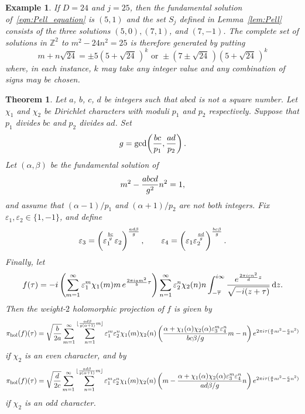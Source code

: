 \documentclass[11pt,reqno]{amsart}
\newtheorem{theorem}{Theorem}[section]
\renewcommand{\=}{\;=\;}
\theoremstyle{myremark}
\newtheorem*{example}{Example}
\newcommand{\dd}{\mathrm{d}}
\begin{document}
\begin{example}{\normalfont
If $D=24$ and $j=25$, then the fundamental solution of~\eqref{eqn:Pell_equation} is $(5,1)$ and the set $S_j$ defined in Lemma~\ref{lem:Pell} consists of the three solutions $(5,0), (7,1)$, and $(7,-1)$. 
The complete set of solutions in $\mathbb{Z}^2$ to $m^2 - 24n^2 = 25$ is therefore generated by putting
\[ 
m+n\sqrt{24} = \pm5(5+\sqrt{24}\,)^k \text{ or } \pm(7\pm\sqrt{24}\,) (5+\sqrt{24}\,)^k 
\]
where, in each instance, $k$ may take any integer value and any combination of signs may be chosen.}
\end{example}

\begin{theorem} \label{thm:hol_proj_eval} 
Let $a$, $b$, $c$, $d$ be integers such that $abcd$ is not a square number. 
Let $\chi_1$ and $\chi_2$ be Dirichlet characters with moduli $p_1$ and $p_2$ respectively. 
Suppose that $p_1$ divides $bc$ and $p_2$ divides $ad$. 
Set
\[ 
g = \gcd \! \left( {bc \over p_1}, {ad \over p_2} \right).
\]
Let $(\alpha,\beta)$ be the fundamental solution of
\[ 
m^2-{abcd \over g^2}n^2=1,
\]
and assume that $(\alpha-1)/p_1$ and $(\alpha+1)/p_2$ are not both integers. 
Fix $\varepsilon_1, \varepsilon_2 \in \{1,-1\}$, and define
\begin{equation} \label{eqn:epsilon_values}
\varepsilon_3 = \left(\varepsilon_1^{bc \over g} \varepsilon_2\right)^{ad\beta \over g}, 
\qquad 
\varepsilon_4 = \left(\varepsilon_1 \varepsilon_2^{ad \over g} \right)^{bc\beta \over g}.
\end{equation}
Finally, let
\begin{align*}
f(\tau) = -i \left( \sum_{m=1}^\infty \varepsilon_1^m \chi_1(m) m \, e^{{2\pi i a m^2 \over b} \tau} \right) \sum_{n=1}^\infty \varepsilon_2^n \chi_2(n) n \int_{-\overline{\tau}}^{i \infty} {e^{{2\pi i c n^2 \over d}z} \over \sqrt{-i(z+\tau)}} \, \dd z.
\end{align*}
Then the weight-$2$ holomorphic projection of $f$ is given by
\begin{equation} \label{eqn:hol_proj_even}
\pi_\text{hol}(f)(\tau) = \sqrt{b \over 2a} \sum_{m=1}^\infty \sum_{n=1}^{\lfloor {ad\beta \over g(\alpha+1)}m \rfloor} \varepsilon_1^m \varepsilon_2^n \chi_1(m) \chi_2(n) \left( {\alpha+\chi_1(\alpha)\chi_2(\alpha) \varepsilon_3^m \varepsilon_4^n \over bc\beta/g} m - n \right) e^{2\pi i \tau ({a \over b} m^2-{c \over d}n^2)}
\end{equation}
if $\chi_2$ is an even character, and by
\begin{equation} \label{eqn:hol_proj_odd}
\pi_\text{hol}(f)(\tau) = \sqrt{d \over 2c} \sum_{m=1}^\infty \sum_{n=1}^{\lfloor {ad\beta \over g(\alpha+1)}m \rfloor} \varepsilon_1^m \varepsilon_2^n \chi_1(m) \chi_2(n) \left( m - {\alpha+\chi_1(\alpha)\chi_2(\alpha) \varepsilon_3^m \varepsilon_4^n \over ad\beta/g} n \right) e^{2\pi i \tau ({a \over b} m^2-{c \over d}n^2)}
\end{equation}
if $\chi_2$ is an odd character.
\end{theorem}
\end{document}
